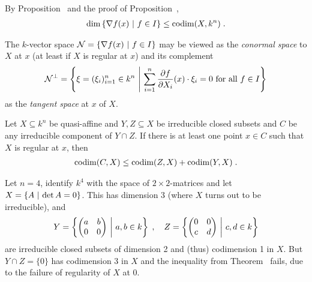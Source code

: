 \documentclass[a4paper,parskip=half,numbers=enddot, DIV=12, headheight=30pt]{scrreprt}
\begin{document}
		
\begin{rem*}
    By Proposition~ and the proof of Proposition~, 
    \begin{align*}
        \dim\left\{\nabla f(x)\ \middle|\  f\in I\right\} \leq \operatorname{codim}(X,k^n)\;.
    \end{align*}
\end{rem*}
\begin{rem}
    The $k$-vector space $\mathcal{N} = \left\{\nabla f(x) \ \middle|\  f\in I\right\}$ may be viewed as the \emph{conormal space} to $X$ at $x$ (at least if $X$ is regular at $x$) and its complement 
    \begin{align*}
        \mathcal{N}^\perp = \left\{ \xi = (\xi_i)_{i=1}^n \in k^n \ \middle|\  \sum_{i=1}^{n}\frac{\partial f}{\partial X_i}(x)\cdot\xi_i=0 \text{ for all } f\in I\right\}
    \end{align*}
    as the \emph{tangent space} at $x$ of $X$.
\end{rem}
\begin{thm}
    Let $X\subseteq k^n$ be quasi-affine and $Y,Z \subseteq X$ be irreducible closed subsets and $C$ be any irreducible component of $Y\cap Z$. If there is at least one point $x\in C$ such that $X$ is regular at $x$, then 
    \begin{align*}
    	\operatorname{codim}(C,X) \leq \operatorname{codim} (Z,X)+\operatorname{codim}(Y,X)\;.
    \end{align*}
\end{thm}
\begin{rem}
    Let $n=4$, identify $k^4$ with the space of $2\times 2$-matrices and let $X= \left\{ A\ \middle|\  \operatorname{det} A = 0\right\}$. This has dimension 3 (where $X$ turns out to be irreducible), and 
    \begin{align*}
        Y = \left\{\begin{pmatrix} a&b\\ 0&0\end{pmatrix} \ \middle|\  a,b\in k \right\}\;,\quad
        Z = \left\{\begin{pmatrix} 0&0\\ c&d\end{pmatrix} \ \middle|\  c,d\in k \right\}
    \end{align*}  
    are irreducible closed subsets of dimension 2 and (thus) codimension 1 in $X$. But $Y\cap Z = \{0\}$ has codimension 3 in $X$ and the inequality from Theorem~ fails, due to the failure of regularity of $X$ at $0$.
\end{rem}
\end{document}
